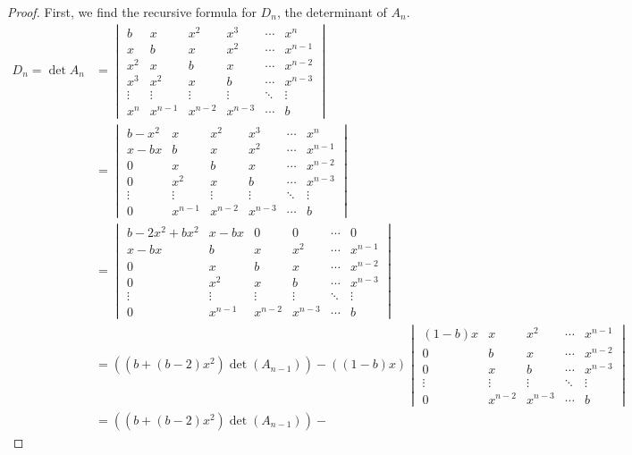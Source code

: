 \documentclass[11pt, letterpaper]{article}
\begin{document}
\begin{proof}
First, we find the recursive formula for $D_n$, the determinant of $A_n$.
\begin{align*}
D_n = \det A_n &= \begin{vmatrix}
b & x & x^2 & x^3 & \cdots & x^n \\
x & b & x & x^2 & \cdots & x^{n-1} \\
x^2 & x & b & x  & \cdots & x^{n-2} \\
x^3 & x^2 & x & b & \cdots & x^{n-3} \\
\vdots & \vdots & \vdots & \vdots & \ddots & \vdots \\
x^n  & x^{n-1} & x^{n-2} & x^{n-3} & \cdots & b
\end{vmatrix}\\
&= \begin{vmatrix}
b -x^2 & x & x^2 & x^3 & \cdots & x^n \\
x-bx & b & x & x^2 & \cdots & x^{n-1} \\
0 & x & b & x  & \cdots & x^{n-2} \\
0 & x^2 & x & b & \cdots & x^{n-3} \\
\vdots & \vdots & \vdots & \vdots & \ddots & \vdots \\
0  & x^{n-1} & x^{n-2} & x^{n-3} & \cdots & b
\end{vmatrix} \\
&=  \begin{vmatrix}
b -2x^2 +  bx^2 & x-bx & 0 & 0 & \cdots & 0 \\
x-bx & b & x & x^2 & \cdots & x^{n-1} \\
0 & x & b & x  & \cdots & x^{n-2} \\
0 & x^2 & x & b & \cdots & x^{n-3} \\
\vdots & \vdots & \vdots & \vdots & \ddots & \vdots \\
0  & x^{n-1} & x^{n-2} & x^{n-3} & \cdots & b
\end{vmatrix} \\
& = \left(\left(b + (b-2)x^2\right) \det (A_{n-1}) \right) - 
\left((1-b)x\right) \begin{vmatrix}
(1-b)x  & x & x^2 & \cdots & x^{n-1} \\
0  & b & x  & \cdots & x^{n-2} \\
0  & x & b & \cdots & x^{n-3} \\
\vdots & \vdots & \vdots & \ddots & \vdots \\
0  & x^{n-2} & x^{n-3} & \cdots & b
\end{vmatrix} \\
& = \left(\left(b + (b-2)x^2\right) \det (A_{n-1}) \right) - 

\end{align*}
\end{proof}
\end{document}
